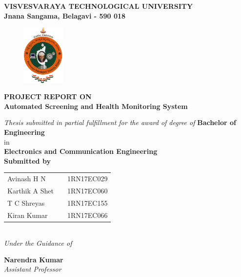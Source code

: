 
\begin{titlingpage}
\thispagestyle{empty}\centering

\setlength{\toptafiddle}{1in}
\setlength{\bottafiddle}{1in}
\vspace*{-1.25in}
\enlargethispage{\toptafiddle}
\large 
\textbf{VISVESVARAYA TECHNOLOGICAL UNIVERSITY\\
	Jnana Sangama, Belagavi - 590 018}\\
\vspace{0.2cm}
\begin{figure}[h]
\centering
\includegraphics[height=3cm]{images/vtu.png}
\end{figure}
{\textbf{PROJECT REPORT ON}}\\

\Huge{\textbf{\color{red} Automated Screening and Health Monitoring System }}
\vspace{0.5cm}

\large \textit{Thesis submitted in partial fulfillment for the award of degree of }{\textbf{Bachelor of Engineering}}\\
in \\\textbf{Electronics and Communication Engineering}
\vspace{0.5cm}\\
{\textbf{Submitted by}}


\begin{tabular}{lll}

Avinash H N & \hspace{5cm}  &1RN17EC029\\
Karthik A Shet &   &1RN17EC060\\
T C Shreyas &   &1RN17EC155\\
Kiran Kumar &   &1RN17EC066\\


\end{tabular}
\vspace{0.5cm}\\
\textit{Under the Guidance of}


\Large{\textbf{Narendra Kumar}}\\
\textit{Assistant Professor}\\


\end{titlingpage}

